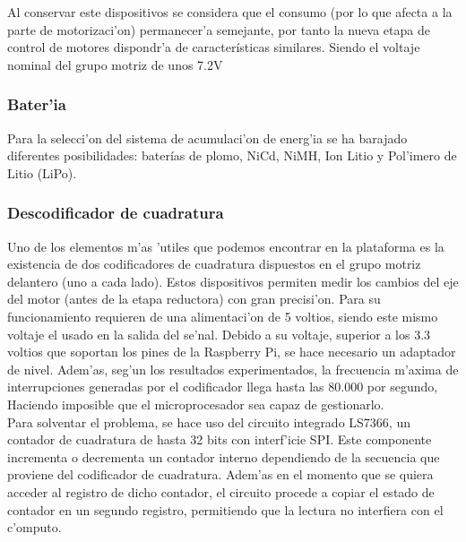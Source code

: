 \documentclass[twoside,12pt]{article}
\begin{document}
Al conservar este dispositivos se considera que el consumo (por lo que afecta a la parte de motorizaci'on) permanecer'a semejante, por tanto la nueva etapa de control de motores dispondr'a de características similares. Siendo el voltaje nominal del grupo motriz de unos 7.2V 

\subsubsection{Bater'ia}
Para la selecci'on del sistema de acumulaci'on de energ'ia se ha barajado diferentes posibilidades: baterías de plomo, NiCd, NiMH, Ion Litio y Pol'imero de Litio (LiPo).  



\subsubsection{Descodificador de cuadratura}
Uno de los elementos m'as 'utiles que podemos encontrar en la plataforma es la existencia de dos codificadores de cuadratura dispuestos en el grupo motriz delantero (uno a cada lado). Estos dispositivos permiten medir los cambios del eje del motor (antes de la etapa reductora) con gran precisi'on. Para su funcionamiento requieren de una alimentaci'on de 5 voltios, siendo este mismo voltaje el usado en la salida del se'nal. Debido a su voltaje, superior a los 3.3 voltios que soportan los pines de la Raspberry Pi, se hace necesario un adaptador de nivel. Adem'as, seg'un los resultados experimentados, la frecuencia m'axima de interrupciones generadas por el codificador llega hasta las 80.000 por segundo, Haciendo imposible que el microprocesador sea capaz de gestionarlo.\\

Para solventar el problema, se hace uso del circuito integrado LS7366, un contador de cuadratura de hasta 32 bits con interf'icie SPI. Este componente incrementa o decrementa un contador interno dependiendo de la secuencia que proviene del codificador de cuadratura. Adem'as en el momento que se quiera acceder al registro de dicho contador, el circuito procede a copiar el estado de contador en un segundo registro, permitiendo que la lectura no interfiera con el c'omputo.
\end{document}
